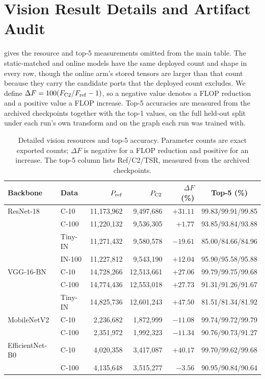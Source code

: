 \documentclass[10pt]{article}
\theoremstyle{paper}
\begin{document}
\section{Vision Result Details and Artifact Audit}
\label{app:vision-results}
 gives the resource and top-5 measurements omitted from the main table. The static-matched and online models have the same deployed count and shape in every row, though the online arm's stored tensors are larger than that count because they carry the candidate ports that the deployed count excludes. We define $\Delta F=100(F_{\rm C2}/F_{\rm ref}-1)$, so a negative value denotes a FLOP reduction and a positive value a FLOP increase. Top-5 accuracies are measured from the archived checkpoints together with the top-1 values, on the full held-out split under each run's own transform and on the graph each run was trained with.

\begin{table}[h]
\centering
\caption{Detailed vision resources and top-5 accuracy. Parameter counts are exact exported counts; $\Delta F$ is negative for a FLOP reduction and positive for an increase. The top-5 column lists Ref/C2/TSR, measured from the archived checkpoints.}
\label{tab:vision-details}
\scriptsize
\setlength{\tabcolsep}{3.2pt}
\begin{tabular}{@{}llrrrc@{}}
\toprule
Backbone & Data & $P_{\rm ref}$ & $P_{\rm C2}$ & $\Delta F$ (\%) & Top-5 (\%) \\
\midrule
ResNet-18 & C-10    & 11,173,962 & 9,497,686 & $+31.11$& 99.83/99.91/99.85 \\
          & C-100   & 11,220,132 & 9,536,305 & $+1.77$ & 93.85/93.84/93.88 \\
          & Tiny-IN & 11,271,432 & 9,580,578 & $-19.61$& 85.00/84.66/84.96 \\
          & IN-100  & 11,227,812 & 9,543,190 & $+12.04$& 95.90/95.58/95.88 \\
\midrule
VGG-16-BN& C-10    & 14,728,266 & 12,513,661& $+27.06$& 99.79/99.75/99.68 \\
          & C-100   & 14,774,436 & 12,553,018& $+27.73$& 91.31/91.26/91.67 \\
          & Tiny-IN & 14,825,736 & 12,601,243& $+47.50$& 81.51/81.34/81.92 \\
\midrule
MobileNetV2& C-10   & 2,236,682  & 1,872,999 & $-11.08$& 99.74/99.72/99.79 \\
          & C-100   & 2,351,972  & 1,992,323 & $-11.34$& 90.76/90.73/91.27 \\
\midrule
EfficientNet-B0& C-10 & 4,020,358& 3,417,087 & $+40.17$& 99.70/99.62/99.68 \\
          & C-100   & 4,135,648  & 3,515,277 & $-3.56$ & 90.95/90.84/90.64 \\
\bottomrule
\end{tabular}
\end{table}
\end{document}
